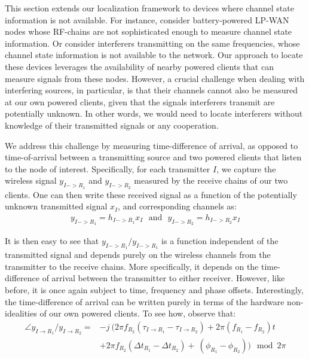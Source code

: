 This section extends our localization framework to devices where channel state information is not available. For instance, consider battery-powered LP-WAN nodes whose RF-chains are not sophisticated enough to measure channel state information. Or consider interferers transmitting on the same frequencies, whose channel state information is not available to the network. Our approach to locate these devices leverages the availability of nearby powered clients that can measure signals from these nodes. However, a crucial challenge when dealing with interfering sources, in particular, is that their channels cannot also be measured at our own powered clients, given that the signals interferers transmit are potentially unknown. In other words, we would need to locate  interferers without knowledge of their transmitted signals or any cooperation. 

We address this challenge by measuring time-difference of arrival, as opposed to time-of-arrival between a transmitting source and two powered clients that listen to the node of interest. Specifically, for each transmitter $I$, we capture the wireless signal $y_{I->R_1}$ and $y_{I->R_2}$ measured by the receive chains of our two clients. One can then write these received signal as a function of the potentially unknown transmitted signal $x_I$, and  corresponding channels as: 
\begin{align*}
y_{I->R_1} =  h_{I->R_1} x_I \text{~~and~~} y_{I->R_2} = h_{I->R_2} x_I 
\end{align*}

It is then easy to see that $y_{I->R_1}/y_{I->R_1}$ is a function independent of the transmitted signal and depends purely on the wireless channels from the transmitter to the receive chains. More specifically, it depends on the time-difference of arrival between the transmitter to either receiver. However, like before, it is once again subject to time, frequency and phase offsets. Interestingly, the time-difference of arrival can be written purely in terms of the hardware non-idealities of our own powered clients. To see how, observe that: 
\begin{align*}
\angle y_{I \rightarrow R_1} /  y_{I \rightarrow R_2} = & -j~(2 \pi f_{R_2} (\tau_{I \rightarrow R_1} - \tau_{I \rightarrow R_2}) + 2 \pi (f_{R_1} - f_{R_2}) t \nonumber \\
& + 2 \pi f_{R_2} (\Delta t_{R_1} - \Delta t_{R_2})  +~(\phi_{R_1} - \phi_{R_2}) ) \mod 2\pi \label{eqn:h2}
\end{align*}

